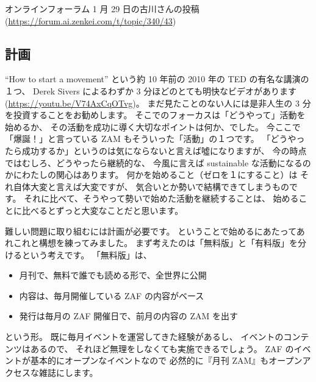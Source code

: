 \documentclass[dvipdfmx,autodetect-engine,10pt,b5paper,papersize,openany,dvipsnames]{jsbook}
\begin{document}
\begin{center}
オンラインフォーラム 1 月 29 日の古川さんの投稿\\
(\url{https://forum.ai.zenkei.com/t/topic/340/43})
\end{center}

\begin{multicols}{2}

\section{計画}
``How to start a movement''
という約 10 年前の 2010 年の TED の有名な講演の１つ、
Derek Sivers によるわずか 3 分ほどのとても明快なビデオがあります
(\url{https://youtu.be/V74AxCqOTvg})。
まだ見たことのない人には是非人生の 3 分を投資することをお勧めします。
そこでのフォーカスは「どうやって」活動を始めるか、
その活動を成功に導く大切なポイントは何か、でした。
今ここで「爆誕！」と言っている ZAM もそういった「活動」の１つです。
「どうやったら成功するか」というのは気にならないと言えば噓になりますが、
今の時点ではむしろ、どうやったら継続的な、
今風に言えば sustainable な活動になるのかにわたしの関心はあります。
何かを始めること（ゼロを１にすること）は
それ自体大変と言えば大変ですが、
気合いとか勢いで結構できてしまうものです。
それに比べて、そうやって勢いで始めた活動を継続することは、
始めることに比べるとずっと大変なことだと思います。

難しい問題に取り組むには計画が必要です。
ということで始めるにあたってあれこれと構想を練ってみました。
まず考えたのは「無料版」と「有料版」を分けるという考えです。
「無料版」は、
\begin{itemize}
\item 月刊で、無料で誰でも読める形で、全世界に公開
\item 内容は、毎月開催している ZAF の内容がベース
\item 発行は毎月の ZAF 開催日で、前月の内容の ZAM を出す
\end{itemize}
という形。
既に毎月イベントを運営してきた経験があるし、
イベントのコンテンツはあるので、
それほど無理をしなくても実施できるでしょう。
ZAF のイベントが基本的にオープンなイベントなので
必然的に『月刊 ZAM』もオープンアクセスな雑誌にします。


\end{multicols}
\end{document}
